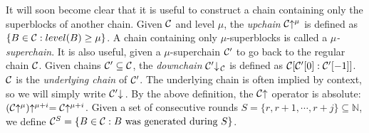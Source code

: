 It will soon become clear that it is useful to construct a chain containing only
the superblocks of another chain. Given $\mathcal{C}$ and level $\mu$, the
\textit{upchain} $\mathcal{C}\negthickspace\uparrow^\mu$ is defined as $\{B \in \mathcal{C}: level(B)
\geq \mu\}$. A chain containing only $\mu$-superblocks is called a
$\mu$\textit{-superchain}. It is also useful, given a $\mu$-superchain $\mathcal{C}'$
to go back to the regular chain $\mathcal{C}$. Given chains $\mathcal{C}' \subseteq
\mathcal{C}$, the \textit{downchain} $\mathcal{C}'\negthickspace\downarrow\,\!\!_{\mathcal{C}}$ is defined as
$\mathcal{C}[\mathcal{C}'[0]:\mathcal{C}'[-1]]$. $\mathcal{C}$ is the \textit{underlying chain} of
$\mathcal{C}'$. The underlying chain is often implied by context, so we will simply
write $\mathcal{C}'\negthickspace\downarrow\,$. By the above definition, the $\mathcal{C}\negthickspace\uparrow$
operator is absolute: $(\mathcal{C}\negthickspace\uparrow^\mu)\negthickspace\uparrow^{\mu + i} =
\mathcal{C}\negthickspace\uparrow^{\mu + i}$. Given a set of consecutive rounds $S = \{r, r + 1,
\cdots, r + j\} \subseteq \mathbb{N}$, we define $\mathcal{C}^S = \{B \in \mathcal{C}: B
\text{ was generated during } S\}$.
